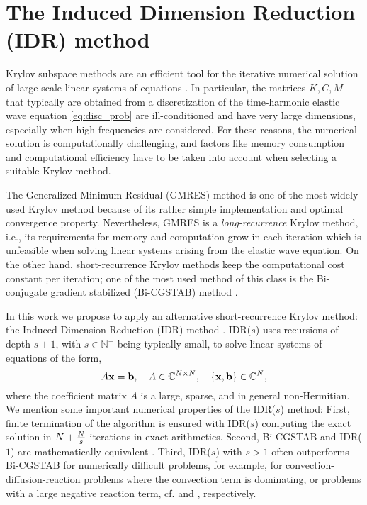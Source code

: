\section{The Induced Dimension Reduction (IDR) method}
\label{ch:idr}
Krylov subspace methods are an efficient tool for the iterative numerical solution of large-scale linear systems of equations \cite{LS13}.
In particular, the matrices $K, C, M$ that typically are obtained from a discretization of the time-harmonic elastic wave equation \eqref{eq:disc_prob} 
are ill-conditioned and have very large dimensions, especially when high frequencies are considered.  
For these reasons, the numerical solution is computationally 
challenging, and factors like memory consumption and computational 
efficiency have to be taken into account when selecting a suitable Krylov method.

The Generalized Minimum Residual (GMRES) method \cite{ss86} is one of the most
widely-used Krylov method because of its rather simple implementation and optimal convergence property. Nevertheless, GMRES is a \textit{long-recurrence}
Krylov method, i.e., its requirements for memory and computation grow in each
iteration which is unfeasible when solving linear systems arising from the elastic wave equation.
On the other hand, short-recurrence Krylov methods keep the computational cost 
constant per iteration; one of the most used method of this class is the 
Bi-conjugate gradient stabilized (Bi-CGSTAB) method \cite{v92}.

In this work we propose to apply an alternative short-recurrence Krylov method: the Induced Dimension Reduction (IDR) method \cite{gs11,sg08}. 
IDR($s$) uses recursions of depth $s+1$, with $s \in \mathbb{N}^+$ being typically small, to solve linear systems of equations of the form,
\begin{equation}\label{lin_sys}
A{\mathbf{x}}=\mathbf{b}, \quad A \in \mathbb{C}^{N \times N}, \quad \{{\mathbf{x}}, \mathbf{b}\} \in \mathbb{C}^N,
\end{equation}
where the coefficient matrix $A$ is a large, sparse, and in general non-Hermitian.
We mention some important numerical properties of the IDR($s$) method: First,
finite termination of the algorithm is ensured with IDR($s$) computing the exact solution 
in $N+\frac{N}{s}$ iterations in exact arithmetics. Second, Bi-CGSTAB and
IDR($1$) are mathematically equivalent \cite{ssg10}. Third, IDR($s$) with $s>1$ 
often outperforms Bi-CGSTAB for numerically difficult problems, for example, for
convection-diffusion-reaction problems where the convection term is dominating, 
or problems with a large negative reaction term, cf. \cite{sg08} and \cite{gs11}, respectively.
